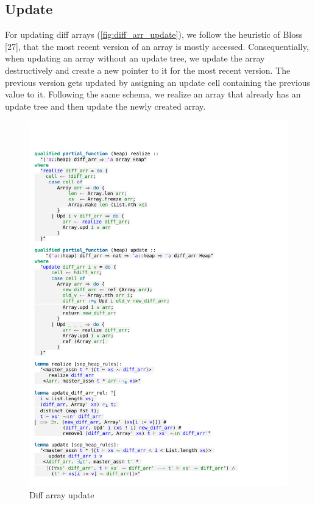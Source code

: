 \subsection{Update}

For updating diff arrays (\autoref{fig:diff_arr_update}), we follow the heuristic of Bloss [27], that the most recent version of an array is mostly accessed. Consequentially, when updating an array without an update tree, we update the array destructively and create a new pointer to it for the most recent version. The previous version gets updated by assigning an update cell containing the previous value to it. Following the same schema, we realize an array that already has an update tree and then update the newly created array.

\begin{figure}[htpb]
    \includegraphics[trim={0 10,6cm 0 10,2cm}, clip, width=1.00\textwidth]{figures/Theory_Diff_Arr_Update.pdf}
    \caption[Diff array update]{Diff array update}
    \label{fig:diff_arr_update}
\end{figure}

